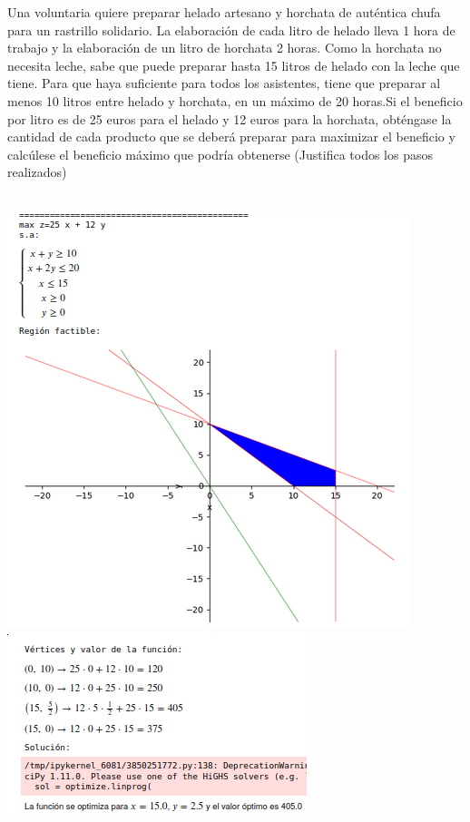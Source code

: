 \documentclass[addpoints,spanish, 12pt,a4paper]{exam}
\begin{document}
\begin{questions}
\question Una voluntaria quiere preparar helado artesano y horchata de
auténtica chufa para un rastrillo solidario. La elaboración de cada litro de helado lleva 1 hora
de trabajo y la elaboración de un litro de horchata 2 horas. Como la horchata no necesita leche,
sabe que puede preparar hasta 15 litros de helado con la leche que tiene. Para que haya suficiente
para todos los asistentes, tiene que preparar al menos 10 litros entre helado y horchata, en un
máximo de 20 horas.Si el beneficio por litro es de 25 euros para el helado y 12 euros para la horchata, obténgase
la cantidad de cada producto que se deberá preparar para maximizar el beneficio y calcúlese
el beneficio máximo que podría obtenerse (Justifica todos los pasos realizados)
\begin{solution}\\
\includegraphics[scale=0.5]{prglin3}\\
\includegraphics[scale=0.8]{prglin4}
\end{solution}


\end{questions}
\end{document}
